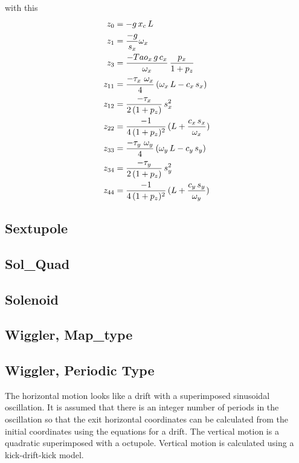 \documentclass{book}
\begin{document}
with this
\begin{align}
  z_0    &= - g \, x_c \, L \nonumber \\
  z_1    &= \frac{-g}{s_x}{\omega_x} \nonumber \\
  z_3    &= \frac{-{\sl Tao}_x \, g \, c_x}{\omega_x} \, \frac{p_x}{1 + p_z} \\
  z_{11} &= \frac{-\tau_x \,\, \omega_x}{4} \, (\omega_x \, L - c_x \, s_x) \nonumber \\
  z_{12} &= \frac{-\tau_x}{2 \, (1 + p_z)} \, s_x^2 \nonumber \\
  z_{22} &= \frac{-1}{4 \, (1 + p_z)^2} \, (L + \frac{c_x \, s_x}{\omega_x}) \nonumber \\
  z_{33} &= \frac{-\tau_y \,\, \omega_y}{4} \, (\omega_y \, L - c_y \, s_y) \nonumber \\
  z_{34} &= \frac{-\tau_y}{2 \, (1 + p_z)} \, s_y^2 \nonumber \\
  z_{44} &= \frac{-1}{4 \, (1 + p_z)^2} \, (L + \frac{c_y \, s_y}{\omega_y}) \nonumber
\end{align}


\subsection{Sextupole}

\subsection{Sol\_Quad}

\subsection{Solenoid}

\subsection{Wiggler, Map\_type}



\subsection{Wiggler, Periodic Type}

The horizontal motion looks like a drift with a superimposed
sinusoidal oscillation. It is assumed that there is an integer number
of periods in the oscillation so that the exit horizontal coordinates
can be calculated from the initial coordinates using the equations for
a drift. The vertical motion is a quadratic superimposed with a
octupole. Vertical motion is calculated using a kick-drift-kick model.
\end{document}
